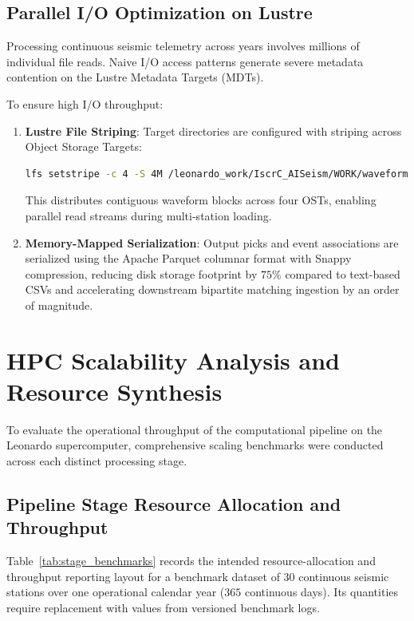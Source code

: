 \subsection{Parallel I/O Optimization on Lustre}
Processing continuous seismic telemetry across years involves millions of individual file reads. Naive I/O access patterns generate severe metadata contention on the Lustre Metadata Targets (MDTs).

To ensure high I/O throughput:
\begin{enumerate}
  \item \textbf{Lustre File Striping}: Target directories are configured with striping across Object Storage Targets:
  \begin{lstlisting}[language=bash,basicstyle=\scriptsize\ttfamily]
lfs setstripe -c 4 -S 4M /leonardo_work/IscrC_AISeism/WORK/waveform
  \end{lstlisting}
  This distributes contiguous waveform blocks across four OSTs, enabling parallel read streams during multi-station loading.
  \item \textbf{Memory-Mapped Serialization}: Output picks and event associations are serialized using the Apache Parquet columnar format with Snappy compression, reducing disk storage footprint by $75\%$ compared to text-based CSVs and accelerating downstream bipartite matching ingestion by an order of magnitude.
\end{enumerate}

\section{HPC Scalability Analysis and Resource Synthesis}
\label{sec:scalability}

To evaluate the operational throughput of the computational pipeline on the Leonardo supercomputer, comprehensive scaling benchmarks were conducted across each distinct processing stage.

\subsection{Pipeline Stage Resource Allocation and Throughput}
Table~\ref{tab:stage_benchmarks} records the intended resource-allocation and throughput reporting layout for a benchmark dataset of 30 continuous seismic stations over one operational calendar year ($365$ continuous days). Its quantities require replacement with values from versioned benchmark logs.

